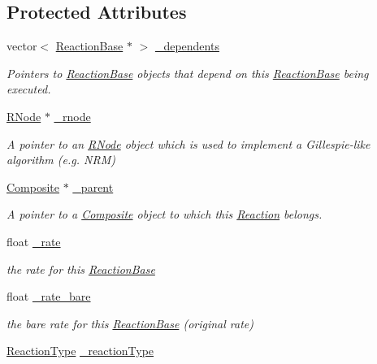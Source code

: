 \subsection*{Protected Attributes}
\begin{DoxyCompactItemize}
\item 
vector$<$ \hyperlink{classReactionBase}{Reaction\+Base} $\ast$ $>$ \hyperlink{classReactionBase_a085e916b6291ef7da5004810c8b58c28}{\+\_\+dependents}
\begin{DoxyCompactList}\small\item\em Pointers to \hyperlink{classReactionBase}{Reaction\+Base} objects that depend on this \hyperlink{classReactionBase}{Reaction\+Base} being executed. \end{DoxyCompactList}\item 
\hyperlink{classRNode}{R\+Node} $\ast$ \hyperlink{classReactionBase_aa402747434b46dbea69b94928140b3a2}{\+\_\+rnode}
\begin{DoxyCompactList}\small\item\em A pointer to an \hyperlink{classRNode}{R\+Node} object which is used to implement a Gillespie-\/like algorithm (e.\+g. N\+R\+M) \end{DoxyCompactList}\item 
\hyperlink{classComposite}{Composite} $\ast$ \hyperlink{classReactionBase_a7ad71ef8d77e5ad85be9126f4f4f4b70}{\+\_\+parent}
\begin{DoxyCompactList}\small\item\em A pointer to a \hyperlink{classComposite}{Composite} object to which this \hyperlink{classReaction}{Reaction} belongs. \end{DoxyCompactList}\item 
float \hyperlink{classReactionBase_a6eea78021fc01eecae6666edc0532e44}{\+\_\+rate}
\begin{DoxyCompactList}\small\item\em the rate for this \hyperlink{classReactionBase}{Reaction\+Base} \end{DoxyCompactList}\item 
float \hyperlink{classReactionBase_a7622cb447ce421d7d062d6bab1105aea}{\+\_\+rate\+\_\+bare}
\begin{DoxyCompactList}\small\item\em the bare rate for this \hyperlink{classReactionBase}{Reaction\+Base} (original rate) \end{DoxyCompactList}\item 
\hyperlink{ReactionBase_8h_a360e20f142dbd097b0d0d0620111b30b}{Reaction\+Type} \hyperlink{classReactionBase_a367c9de5f4d7d589d846c0201e9ca273}{\+\_\+reaction\+Type}

\end{DoxyCompactItemize}
